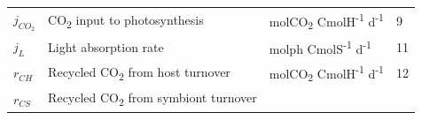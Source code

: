 \documentclass[]{elsarticle} %
\begin{document}
\begin{longtable}[c]{@{}llll@{}}
\begin{minipage}[t]{0.10\columnwidth}\raggedright\strut
\(j_{CO_2}\)
\strut\end{minipage} &
\begin{minipage}[t]{0.48\columnwidth}\raggedright\strut
CO\textsubscript{2} input to photosynthesis
\strut\end{minipage} &
\begin{minipage}[t]{0.25\columnwidth}\raggedright\strut
molCO\textsubscript{2} CmolH\textsuperscript{-1} d\textsuperscript{-1}
\strut\end{minipage} &
\begin{minipage}[t]{0.10\columnwidth}\raggedright\strut
9
\strut\end{minipage}\tabularnewline
\begin{minipage}[t]{0.10\columnwidth}\raggedright\strut
\(j_L\)
\strut\end{minipage} &
\begin{minipage}[t]{0.48\columnwidth}\raggedright\strut
Light absorption rate
\strut\end{minipage} &
\begin{minipage}[t]{0.25\columnwidth}\raggedright\strut
molph CmolS\textsuperscript{-1} d\textsuperscript{-1}
\strut\end{minipage} &
\begin{minipage}[t]{0.10\columnwidth}\raggedright\strut
11
\strut\end{minipage}\tabularnewline
\begin{minipage}[t]{0.10\columnwidth}\raggedright\strut
\(r_{CH}\)
\strut\end{minipage} &
\begin{minipage}[t]{0.48\columnwidth}\raggedright\strut
Recycled CO\textsubscript{2} from host turnover
\strut\end{minipage} &
\begin{minipage}[t]{0.25\columnwidth}\raggedright\strut
molCO\textsubscript{2} CmolH\textsuperscript{-1} d\textsuperscript{-1}
\strut\end{minipage} &
\begin{minipage}[t]{0.10\columnwidth}\raggedright\strut
12
\strut\end{minipage}\tabularnewline
\begin{minipage}[t]{0.10\columnwidth}\raggedright\strut
\(r_{CS}\)
\strut\end{minipage} &
\begin{minipage}[t]{0.48\columnwidth}\raggedright\strut
Recycled CO\textsubscript{2} from symbiont turnover

\end{minipage}
\end{longtable}
\end{document}
